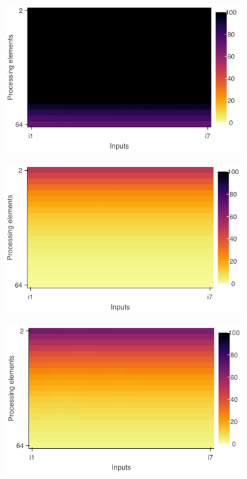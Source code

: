 \begin{figure}[H]
	\begin{subfigure}[b]{0.45\textwidth}
		\includegraphics[width=\textwidth]{pascalanalyzer/figures/results/regionscomparison_r1.pdf}
		\label{fig:pv_regionscomparison_a}
	\end{subfigure}
	\begin{subfigure}[b]{0.45\textwidth}
		\includegraphics[width=\textwidth]{pascalanalyzer/figures/results/regionscomparison_r2.pdf}
		\label{fig:pv_regionscomparison_b}
	\end{subfigure}
	\begin{subfigure}[b]{0.45\textwidth}
		\includegraphics[width=\textwidth]{pascalanalyzer/figures/results/regionscomparison_whole.pdf}

\end{subfigure}
\end{figure}
